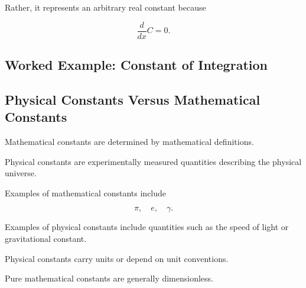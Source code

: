 Rather, it represents an arbitrary real constant because

\[
\frac{d}{dx}C=0.
\]

\subsection{Worked Example: Constant of Integration}
\label{subsec:worked-constant-integration}


\subsection{Physical Constants Versus Mathematical Constants}
\label{subsec:physical-versus-mathematical-constants}

Mathematical constants are determined by mathematical definitions.

Physical constants are experimentally measured quantities describing the
physical universe.

Examples of mathematical constants include

\[
\boxed{
\pi,
\quad
e,
\quad
\gamma.
}
\]

Examples of physical constants include quantities such as the speed of light
or gravitational constant.

Physical constants carry units or depend on unit conventions.

Pure mathematical constants are generally dimensionless.

